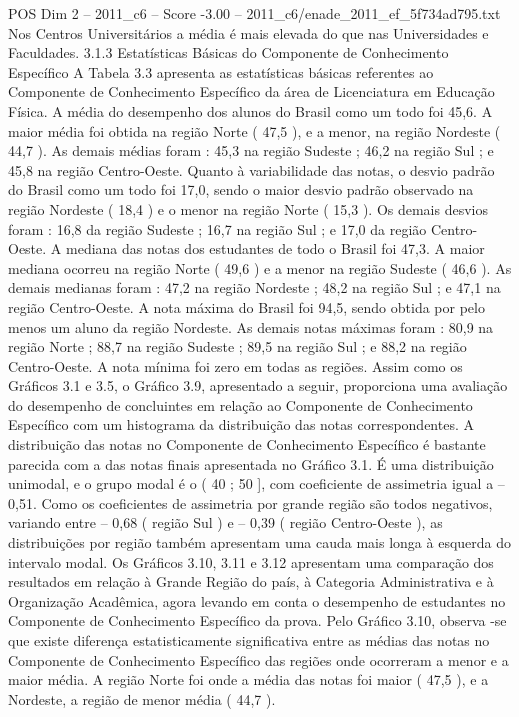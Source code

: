 \begin{textsample}{POS Dim 2 – 2011\_c6 – Score -3.00 – 2011\_c6/enade\_2011\_ef\_5f734ad795.txt}
Nos Centros Universitários a média é mais elevada do que nas Universidades e Faculdades. 3.1.3 Estatísticas Básicas do Componente de Conhecimento Específico A Tabela 3.3 apresenta as estatísticas básicas referentes ao Componente de Conhecimento Específico da área de Licenciatura em Educação Física.
A média do desempenho dos alunos do Brasil como um todo foi 45,6.
A maior média foi obtida na região Norte ( 47,5 ), e a menor, na região Nordeste ( 44,7 ).
As demais médias foram : 45,3 na região Sudeste ; 46,2 na região Sul ; e 45,8 na região Centro-Oeste.
Quanto à variabilidade das notas, o desvio padrão do Brasil como um todo foi 17,0, sendo o maior desvio padrão observado na região Nordeste ( 18,4 ) e o menor na região Norte ( 15,3 ).
Os demais desvios foram : 16,8 da região Sudeste ; 16,7 na região Sul ; e 17,0 da região Centro-Oeste.
A mediana das notas dos estudantes de todo o Brasil foi 47,3.
A maior mediana ocorreu na região Norte ( 49,6 ) e a menor na região Sudeste ( 46,6 ).
As demais medianas foram : 47,2 na região Nordeste ; 48,2 na região Sul ; e 47,1 na região Centro-Oeste.
A nota máxima do Brasil foi 94,5, sendo obtida por pelo menos um aluno da região Nordeste.
As demais notas máximas foram : 80,9 na região Norte ; 88,7 na região Sudeste ; 89,5 na região Sul ; e 88,2 na região Centro-Oeste.
A nota mínima foi zero em todas as regiões.
Assim como os Gráficos 3.1 e 3.5, o Gráfico 3.9, apresentado a seguir, proporciona uma avaliação do desempenho de concluintes em relação ao Componente de Conhecimento Específico com um histograma da distribuição das notas correspondentes.
A distribuição das notas no Componente de Conhecimento Específico é bastante parecida com a das notas finais apresentada no Gráfico 3.1.
É uma distribuição unimodal, e o grupo modal é o ( 40 ; 50 ], com coeficiente de assimetria igual a – 0,51.
Como os coeficientes de assimetria por grande região são todos negativos, variando entre – 0,68 ( região Sul ) e – 0,39 ( região Centro-Oeste ), as distribuições por região também apresentam uma cauda mais longa à esquerda do intervalo modal.
Os Gráficos 3.10, 3.11 e 3.12 apresentam uma comparação dos resultados em relação à Grande Região do país, à Categoria Administrativa e à Organização Acadêmica, agora levando em conta o desempenho de estudantes no Componente de Conhecimento Específico da prova.
Pelo Gráfico 3.10, observa -se que existe diferença estatisticamente significativa entre as médias das notas no Componente de Conhecimento Específico das regiões onde ocorreram a menor e a maior média.
A região Norte foi onde a média das notas foi maior ( 47,5 ), e a Nordeste, a região de menor média ( 44,7 ).

\end{textsample}
